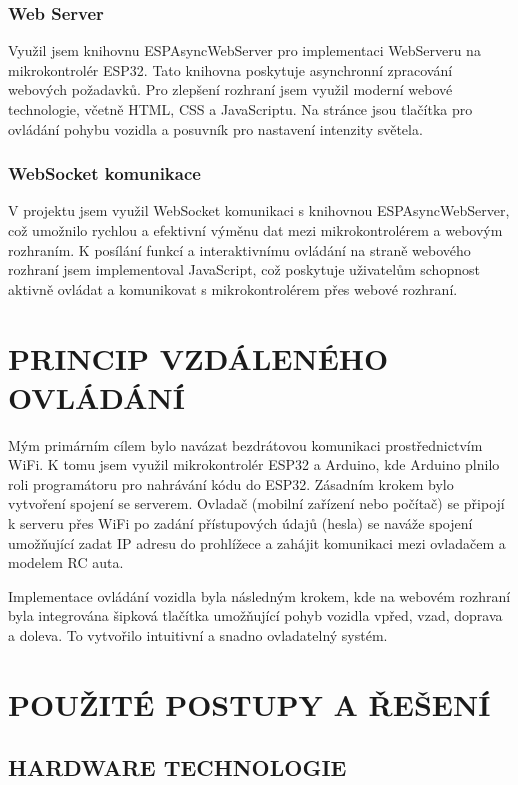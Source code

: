 \documentclass[12pt, a4paper,
oneside,      %
openany
]{report}
\begin{document}
\newpage
\subsection{Web Server}
\noindent Využil jsem knihovnu ESPAsyncWebServer pro implementaci WebServeru na mikrokontrolér ESP32. Tato knihovna poskytuje asynchronní zpracování webových požadavků. Pro zlepšení rozhraní jsem využil moderní webové technologie, včetně HTML, CSS a JavaScriptu. Na stránce jsou tlačítka pro ovládání pohybu vozidla a posuvník pro nastavení intenzity světela.

\subsection{WebSocket komunikace}
\noindent V projektu jsem využil WebSocket komunikaci s knihovnou ESPAsyncWebServer, což umožnilo rychlou a efektivní výměnu dat mezi mikrokontrolérem a webovým rozhraním. K posílání funkcí a interaktivnímu ovládání na straně webového rozhraní jsem implementoval JavaScript, což poskytuje uživatelům schopnost aktivně ovládat a komunikovat s mikrokontrolérem přes webové rozhraní.

\chapter{PRINCIP VZDÁLENÉHO OVLÁDÁNÍ}
\noindent Mým primárním cílem bylo navázat bezdrátovou komunikaci prostřednictvím WiFi. K tomu jsem využil mikrokontrolér ESP32 a Arduino, kde Arduino plnilo roli programátoru pro nahrávání kódu do ESP32. Zásadním krokem bylo vytvoření spojení se serverem. Ovladač (mobilní zařízení nebo počítač) se připojí k serveru přes WiFi po zadání přístupových údajů (hesla) se naváže spojení umožňující zadat IP adresu do prohlížece a zahájit komunikaci mezi ovladačem a modelem RC auta.

\noindent Implementace ovládání vozidla byla následným krokem, kde na webovém rozhraní byla integrována šipková tlačítka umožňující pohyb vozidla vpřed, vzad, doprava a doleva. To vytvořilo intuitivní a snadno ovladatelný systém.





\chapter{POUŽITÉ POSTUPY A ŘEŠENÍ}

\section{HARDWARE TECHNOLOGIE}
\end{document}
